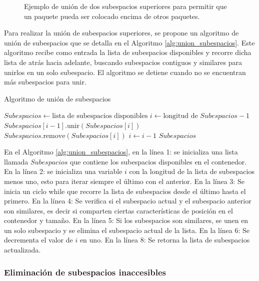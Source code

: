 \documentclass[openany]{article}
\begin{document}
\begin{figure}[H]
    \centering
    
    \caption{Ejemplo de unión de dos subespacios superiores para permitir que un paquete pueda ser colocado encima de otros paquetes.}
    \label{fig:union_subespacios}
\end{figure}

Para realizar la unión de subespacios superiores, se propone un algoritmo de unión de subespacios que se detalla en el Algoritmo \ref{alg:union_subespacios}. Este algoritmo recibe como entrada la lista de subespacios disponibles y recorre dicha lista de atrás hacia adelante, buscando subespacios contiguos y similares para unirlos en un solo subespacio. El algoritmo se detiene cuando no se encuentran más subespacios para unir.

\begin{algorithm}[H]
    \caption{Algoritmo de unión de subespacios}
    \label{alg:union_subespacios}
    \begin{algorithmic}[1]
        \State $Subespacios \gets \text{lista de subespacios disponibles}$
        \State $i \gets \text{longitud de } Subespacios - 1$
        \State $Subespacios[i-1].\text{unir}(Subespacios[i])$
        \State $Subespacios.\text{remove}(Subespacios[i])$
        \EndIf
        \State $i \gets i - 1$
        \EndWhile
        \State \Return $Subespacios$
    \end{algorithmic}
\end{algorithm}

En el Algoritmo \ref{alg:union_subespacios}, en la línea 1: se inicializa una lista llamada $Subespacios$ que contiene los subespacios disponibles en el contenedor. En la línea 2: se inicializa una variable $i$ con la longitud de la lista de subespacios menos uno, esto para iterar siempre el último con el anterior. En la línea 3: Se inicia un ciclo while que recorre la lista de subespacios desde el último hasta el primero. En la línea 4: Se verifica si el subespacio actual y el subespacio anterior son similares, es decir si comparten ciertas características de posición en el contenedor y tamaño. En la línea 5: Si los subespacios son similares, se unen en un solo subespacio y se elimina el subespacio actual de la lista. En la línea 6: Se decrementa el valor de $i$ en uno. En la línea 8: Se retorna la lista de subespacios actualizada.

\subsubsection{Eliminación de subespacios inaccesibles}
\end{document}
